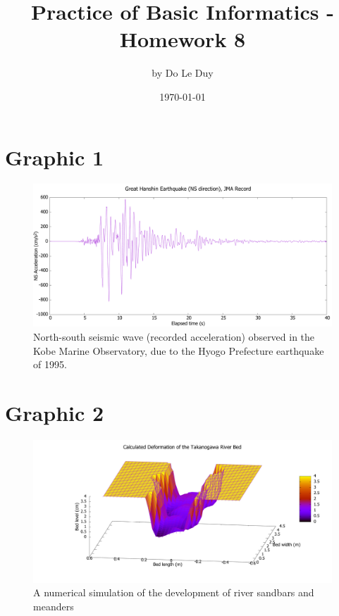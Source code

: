 \documentclass[11pt]{article}
\title{Practice of Basic Informatics - Homework 8}
\author{by Do Le Duy}
\date{\today}
\begin{document}
\maketitle
\section{Graphic 1}

\begin{figure}[H] 
    \begin{center} 
        \includegraphics[scale=0.25]{1} 
    \end{center} 
    \caption{North-south seismic wave (recorded acceleration) observed in the
    Kobe Marine Observatory, due to the Hyogo Prefecture earthquake of 1995.} 
\end{figure}

\section{Graphic 2}
\begin{figure}[H] 
    \begin{center} 
        \includegraphics[scale=0.25]{2} 
    \end{center} 
    \caption{A numerical simulation of the development of river sandbars and meanders} 
\end{figure}
\end{document}
